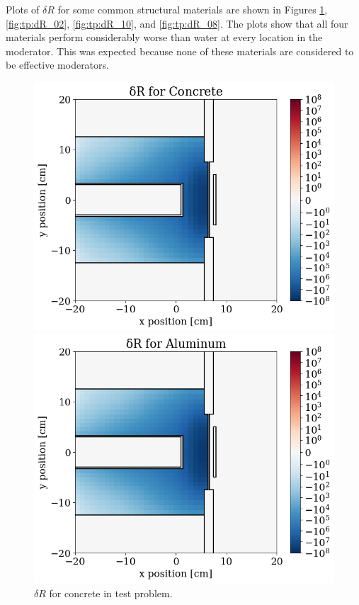 Plots of $\delta R$ for some common structural materials are shown in Figures \ref{fig:tp:dR_07}, \ref{fig:tp:dR_02}, \ref{fig:tp:dR_10}, and \ref{fig:tp:dR_08}.
The plots show that all four materials perform considerably worse than water at every location in the moderator.
This was expected because none of these materials are considered to be effective moderators.

\begin{figure}
  \begin{minipage}{0.495\linewidth}
    \centering
    \includegraphics[width=\linewidth]{content/testprob/dR_07.png}
    \caption{$\delta R$ for concrete in test problem.}
    \label{fig:tp:dR_07}
  \end{minipage}
  \hfill
  \begin{minipage}{0.495\linewidth}
    \centering
    \includegraphics[width=\linewidth]{content/testprob/dR_02.png}

\end{minipage}
\end{figure}

